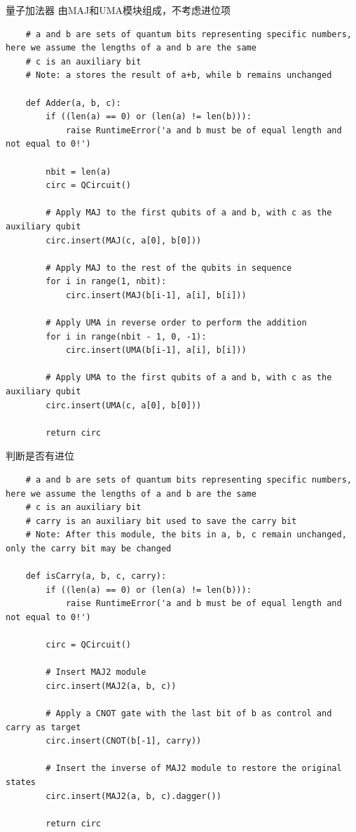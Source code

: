 \documentclass[12pt,hyperref,a4paper,UTF8]{ctexart}
\begin{document}
量子加法器 由MAJ和UMA模块组成，不考虑进位项
\begin{lstlisting}
    # a and b are sets of quantum bits representing specific numbers, here we assume the lengths of a and b are the same
    # c is an auxiliary bit
    # Note: a stores the result of a+b, while b remains unchanged

    def Adder(a, b, c):
        if ((len(a) == 0) or (len(a) != len(b))):
            raise RuntimeError('a and b must be of equal length and not equal to 0!')

        nbit = len(a)
        circ = QCircuit()

        # Apply MAJ to the first qubits of a and b, with c as the auxiliary qubit
        circ.insert(MAJ(c, a[0], b[0]))

        # Apply MAJ to the rest of the qubits in sequence
        for i in range(1, nbit):
            circ.insert(MAJ(b[i-1], a[i], b[i]))

        # Apply UMA in reverse order to perform the addition
        for i in range(nbit - 1, 0, -1):
            circ.insert(UMA(b[i-1], a[i], b[i]))

        # Apply UMA to the first qubits of a and b, with c as the auxiliary qubit
        circ.insert(UMA(c, a[0], b[0]))

        return circ
\end{lstlisting}

判断是否有进位
\begin{lstlisting}
    # a and b are sets of quantum bits representing specific numbers, here we assume the lengths of a and b are the same
    # c is an auxiliary bit
    # carry is an auxiliary bit used to save the carry bit
    # Note: After this module, the bits in a, b, c remain unchanged, only the carry bit may be changed

    def isCarry(a, b, c, carry):
        if ((len(a) == 0) or (len(a) != len(b))):
            raise RuntimeError('a and b must be of equal length and not equal to 0!')

        circ = QCircuit()

        # Insert MAJ2 module
        circ.insert(MAJ2(a, b, c))

        # Apply a CNOT gate with the last bit of b as control and carry as target
        circ.insert(CNOT(b[-1], carry))

        # Insert the inverse of MAJ2 module to restore the original states
        circ.insert(MAJ2(a, b, c).dagger())

        return circ
\end{lstlisting}
\end{document}
